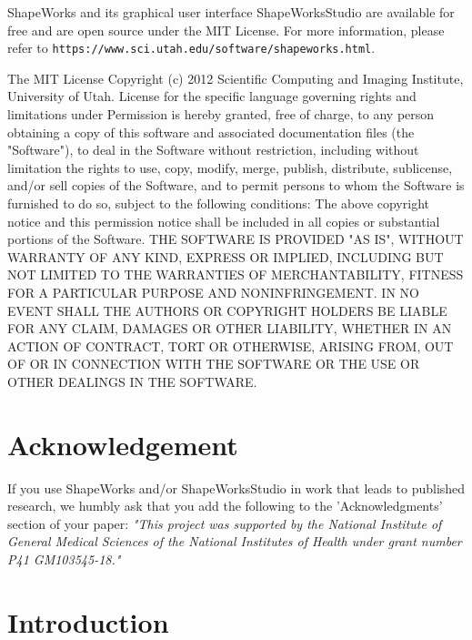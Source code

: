 \documentclass[letterpaper,12pt]{article}   %
\begin{document}
ShapeWorks and its graphical user interface ShapeWorksStudio are available for free and are open source under the MIT License. For more information, please refer to \texttt{https://www.sci.utah.edu/software/shapeworks.html}.

The MIT License Copyright (c) 2012 Scientific Computing and Imaging Institute, University of Utah. License for the specific language governing rights and limitations under Permission is hereby granted, free of charge, to any person obtaining a copy of this software and associated documentation files (the "Software"), to deal in the Software without restriction, including without limitation the rights to use, copy, modify, merge, publish, distribute, sublicense, and/or sell copies of the Software, and to permit persons to whom the Software is furnished to do so, subject to the following conditions: The above copyright notice and this permission notice shall be included in all copies or substantial portions of the Software. THE SOFTWARE IS PROVIDED "AS IS", WITHOUT WARRANTY OF ANY KIND, EXPRESS OR IMPLIED, INCLUDING BUT NOT LIMITED TO THE WARRANTIES OF MERCHANTABILITY, FITNESS FOR A PARTICULAR PURPOSE AND NONINFRINGEMENT. IN NO EVENT SHALL THE AUTHORS OR COPYRIGHT HOLDERS BE LIABLE FOR ANY CLAIM, DAMAGES OR OTHER LIABILITY, WHETHER IN AN ACTION OF CONTRACT, TORT OR OTHERWISE, ARISING FROM, OUT OF OR IN CONNECTION WITH THE SOFTWARE OR THE USE OR OTHER DEALINGS IN THE SOFTWARE.

\section{Acknowledgement}

If you use ShapeWorks and/or ShapeWorksStudio in work that leads to published research, we humbly ask that you add the following to the 'Acknowledgments' section of your paper: \textit{"This project was supported by the National Institute of General Medical Sciences of the National Institutes of Health under grant number P41 GM103545-18."}

\section{Introduction}
\end{document}
